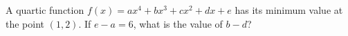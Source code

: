 A quartic function $f(x)=ax^4+bx^3+cx^2+dx+e$ has its minimum value at the point $(1,2)$. If $e-a=6$, what is the value of $b-d$?
